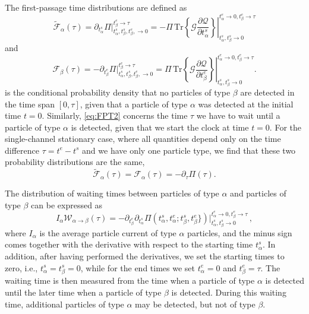 \documentclass[aps,prl,amsmath,twocolumn,floatfix,superscriptaddress,longbibliography,footinbib]{revtex4-1}
\begin{document}
The first-passage time distributions are defined as 
\begin{equation}
	\tilde{\mathcal{F}}_{\alpha}(\tau) = \partial_{t^{s}_{\alpha}} \Pi\big|_{t^{s}_\alpha,t^s_\beta,t^e_\beta,\rightarrow 0}^{t^{e}_\beta\rightarrow \tau} = -\Pi\, \left. \mathrm{Tr}\left\{ \mathcal{G}\frac{\partial \mathcal{Q}}{\partial t^{s}_{\alpha}}\right\} \right|_{t^{s}_\alpha,t^s_\beta\rightarrow 0}^{t^e_\alpha\rightarrow 0, t^{e}_\beta\rightarrow \tau} 
	\label{eq:FPT1}
\end{equation}
and
\begin{equation}
	\mathcal{F}_{\beta}(\tau) =-\partial_{t^{e}_{\beta}}\Pi\big|_{t^{s}_\alpha,t^s_\beta,t^e_\beta,\rightarrow 0}^{t^{e}_\beta\rightarrow \tau}=\Pi\,  \left. \mathrm{Tr}\left\{\mathcal{G} \frac{\partial \mathcal{Q}}{\partial t^{e}_{\beta}}\right\} \right|_{t^{s}_\alpha,t^s_\beta\rightarrow 0}^{t^e_\alpha\rightarrow 0, t^{e}_\beta\rightarrow \tau} .
	\label{eq:FPT2}
\end{equation}
 is the conditional probability density that no particles of type $\beta$ are detected in the time span $[0,\tau]$, given that a particle of type $\alpha$ was detected at the initial time $t\!=\!0$. Similarly, \cref{eq:FPT2} concerns the time $\tau$ we have to wait until a particle of type $\alpha$ is detected, given that we start the clock at time $t\!=\!0$. 
For the single-channel stationary case, where all quantities depend only on the time difference $\tau= t^e-t^s$ and we have only one particle type, we find that these two probability distributions are the same, 
\[
\tilde{\mathcal{F}}_\alpha(\tau) = \mathcal{F}_\alpha(\tau) = -\partial_\tau \Pi(\tau) .
\]

The distribution of waiting times between particles of type $\alpha$ and particles of type $\beta$ can be expressed as~\cite{Dasenbrook2015}
\begin{equation}
	I_{\alpha} \mathcal{W}_{\alpha \rightarrow \beta}(\tau)  = -\partial_{t^{e}_\beta} \partial_{t^{s}_\alpha}\Pi(t_{\alpha}^s,t_{\alpha}^e;t_{\beta}^s,t_\beta^e\})\big|_{t^{s}_\alpha,t^s_\beta \rightarrow 0}^{t^e_\alpha \rightarrow 0, t^{e}_\beta\rightarrow \tau} \,,
	\label{eq:WTD}
\end{equation}
where $I_\alpha$ is the average particle current of type $\alpha$ particles, and the minus sign comes together with the derivative with respect to the starting time $t_\alpha^s$. In addition, after having performed the derivatives, we set the starting times to zero, i.e., $t_\alpha^s\!=\!t_\beta^s=0$, while for the end times we set $t^{e}_\alpha\!=\! 0$ and $t^{e}_\beta\!=\!\tau$.  The waiting time is then measured from the time when a particle of type $\alpha$ is detected until the later time when a particle of type $\beta$ is detected. During this waiting time, additional particles of type $\alpha$ may be detected, but not of type $\beta$.
\end{document}
